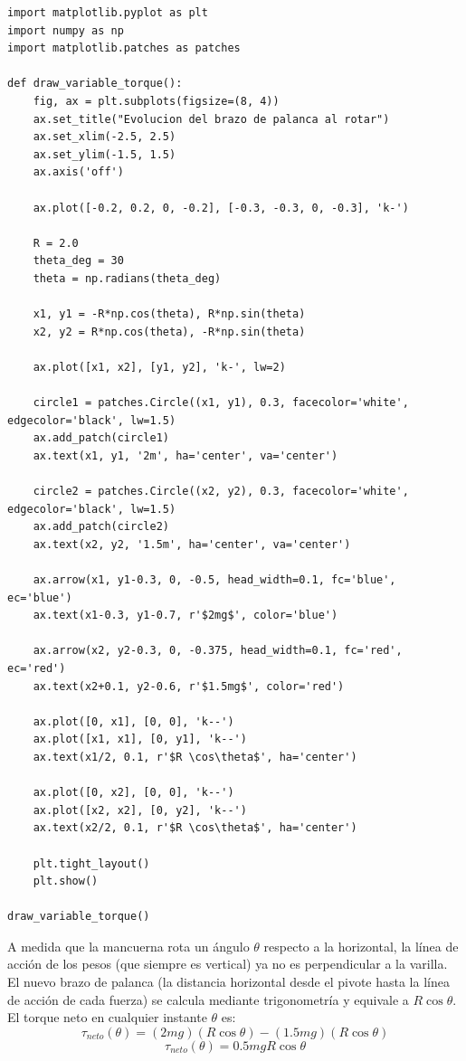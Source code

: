 \documentclass[12pt, a4paper]{article}
\begin{document}
\begin{lstlisting}
import matplotlib.pyplot as plt
import numpy as np
import matplotlib.patches as patches

def draw_variable_torque():
    fig, ax = plt.subplots(figsize=(8, 4))
    ax.set_title("Evolucion del brazo de palanca al rotar")
    ax.set_xlim(-2.5, 2.5)
    ax.set_ylim(-1.5, 1.5)
    ax.axis('off')

    ax.plot([-0.2, 0.2, 0, -0.2], [-0.3, -0.3, 0, -0.3], 'k-')
    
    R = 2.0
    theta_deg = 30
    theta = np.radians(theta_deg)
    
    x1, y1 = -R*np.cos(theta), R*np.sin(theta)
    x2, y2 = R*np.cos(theta), -R*np.sin(theta)
    
    ax.plot([x1, x2], [y1, y2], 'k-', lw=2)
    
    circle1 = patches.Circle((x1, y1), 0.3, facecolor='white', edgecolor='black', lw=1.5)
    ax.add_patch(circle1)
    ax.text(x1, y1, '2m', ha='center', va='center')
    
    circle2 = patches.Circle((x2, y2), 0.3, facecolor='white', edgecolor='black', lw=1.5)
    ax.add_patch(circle2)
    ax.text(x2, y2, '1.5m', ha='center', va='center')
    
    ax.arrow(x1, y1-0.3, 0, -0.5, head_width=0.1, fc='blue', ec='blue')
    ax.text(x1-0.3, y1-0.7, r'$2mg$', color='blue')
    
    ax.arrow(x2, y2-0.3, 0, -0.375, head_width=0.1, fc='red', ec='red')
    ax.text(x2+0.1, y2-0.6, r'$1.5mg$', color='red')
    
    ax.plot([0, x1], [0, 0], 'k--')
    ax.plot([x1, x1], [0, y1], 'k--')
    ax.text(x1/2, 0.1, r'$R \cos\theta$', ha='center')

    ax.plot([0, x2], [0, 0], 'k--')
    ax.plot([x2, x2], [0, y2], 'k--')
    ax.text(x2/2, 0.1, r'$R \cos\theta$', ha='center')

    plt.tight_layout()
    plt.show()

draw_variable_torque()
\end{lstlisting}

A medida que la mancuerna rota un ángulo $\theta$ respecto a la horizontal, la línea de acción de los pesos (que siempre es vertical) ya no es perpendicular a la varilla. 
El nuevo brazo de palanca (la distancia horizontal desde el pivote hasta la línea de acción de cada fuerza) se calcula mediante trigonometría y equivale a $R \cos\theta$.
El torque neto en cualquier instante $\theta$ es:
$$\tau_{neto}(\theta) = (2mg)(R \cos\theta) - (1.5mg)(R \cos\theta)$$
$$\tau_{neto}(\theta) = 0.5mgR \cos\theta$$
\end{document}
